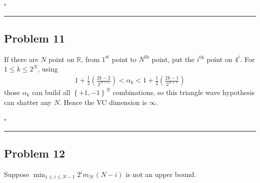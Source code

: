 \documentclass[12pt]{article}
\newcommand*{\QEDB}{\hfill\ensuremath{\square}}
\newcommand{\CBrackets}[1]{\left\{#1\right\}}
\newcommand{\ParTh}[1]{\left(#1\right)}
\newcommand{\Floor}[1]{\left\lfloor#1\right\rfloor}
\newcommand{\Divide}[2]{\left.#1\middle/#2\right.}
\newcommand{\horrule}[1]{\rule{\linewidth}{#1}}
\begin{document}
\QEDB

\horrule{0.5pt}

\subsection*{Problem 11}

If there are $N$ point on $\mathbb{R}$, from $1^{\text{st}}$ point to $N^{\text{th}}$ point, put the $i^{\text{th}}$ point on $4^{i}$. For $1\leq k\leq2^N$, using
\begin{align}
1+\frac{1}{2}\ParTh{\frac{2k-2}{2^{N+1}}} < \alpha_k < 1+\frac{1}{2}\ParTh{\frac{2k-1}{2^{N+1}}}
\end{align}
those $\alpha_k$ can build all $\CBrackets{+1,-1}^N$ combinations, so this triangle wave hypothesis can shatter any $N$. Hence the VC dimension is $\infty$.

\QEDB

\horrule{0.5pt}

\subsection*{Problem 12}

Suppose $\min_{1\leq i\leq N-1}2^im_{\mathcal{H}}\ParTh{N-i}$ is not an upper bound.
\end{document}
